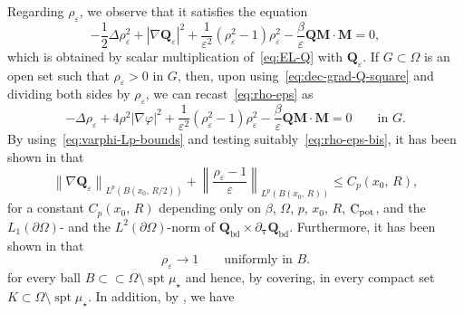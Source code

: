 \documentclass[a4paper, 11pt, twoside, leqno]{article}
\theoremstyle{definition}              %
\theoremstyle{remark}                  %
\DeclareMathOperator{\spt}{spt}                                     %
\newcommand{\abs}[1]{\left| #1 \right|}                             %
\newcommand{\norm}[1]{\left\| #1 \right\|}                          %
\newcommand{\csubset}{\subset\!\subset}                             %
\newcommand{\Q}{\mathbf{Q}}
\newcommand{\M}{\mathbf{M}}
\newcommand{\eps}{\varepsilon}
\newcommand{\ttau}{{\boldsymbol{\tau}}}
\newcommand{\Qb}{\Q_{\mathrm{bd}}}
\begin{document}
Regarding $\rho_\eps$, we observe that it satisfies the 
equation
\begin{equation}\label{eq:rho-eps}
	-\frac{1}{2} \Delta \rho_\eps^2 + \abs{\nabla \Q_\eps}^2 + 
	\frac{1}{\eps^2}\left(\rho_\eps^2 - 1 \right) \rho_\eps^2 
	- \frac{\beta}{\eps} \Q \M \cdot \M = 0,   
\end{equation}
which is obtained by scalar multiplication of~\eqref{eq:EL-Q} 
with $\Q_\eps$. If $G \subset \Omega$ is an open set such that 
$\rho_\eps > 0$ in $G$, then, upon using~\eqref{eq:dec-grad-Q-square} 
and dividing both sides by $\rho_\eps$, 
we can recast~\eqref{eq:rho-eps} as
\begin{equation}\label{eq:rho-eps-bis}
	-\Delta \rho_\eps + 4 \rho^2 \abs{\nabla \varphi}^2 + 
	\frac{1}{\eps^2}\left(\rho_\eps^2 - 1 \right) \rho_\eps^2 
	- \frac{\beta}{\eps} \Q \M \cdot \M = 0 \qquad \mbox{in } G.
\end{equation} 
By using~\eqref{eq:varphi-Lp-bounds} and testing suitably~\eqref{eq:rho-eps-bis}, 
it has been shown in \cite[Proposition~2.6]{CDS1} that 
\begin{equation}\label{eq:GL-bounds-p}
	\norm{\nabla \Q_\eps}_{L^p(B(x_0,\,R/2))} + \norm{\frac{\rho_\eps - 1}{\eps}}_{L^p(B(x_0,\,R))} \leq C_{p}(x_0,\,R),
\end{equation}
for a constant $C_p(x_0,\,R)$ depending only on 
$\beta$, $\Omega$, $p$, $x_0$, $R$, 
${\rm C}_{\rm pot}$, and the $L_1(\partial\Omega)$- and the $L^2(\partial\Omega)$-norm
of $\Qb \times \partial_{\ttau}\Qb$.
Furthermore, it has been shown in \cite[Lemma~2.8]{CDS1} that 
\begin{equation}\label{eq:rho-unif-conv}
    \rho_\eps \to 1 \qquad \mbox{uniformly in } B.
\end{equation}
for every ball $B \csubset \Omega \setminus \spt\mu_\star$ 
and hence, by covering, in every compact set $K \subset \Omega\setminus \spt\mu_\star$. 
In addition, by \cite[Lemma~3.7]{CDS1}, we have  
\end{document}
